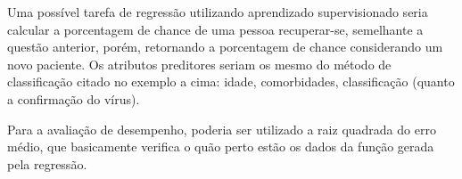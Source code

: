 Uma possível tarefa de regressão utilizando aprendizado supervisionado seria calcular a porcentagem de chance de uma pessoa recuperar-se, semelhante a questão anterior, porém, retornando a porcentagem de chance considerando um novo paciente. Os atributos preditores seriam os mesmo do método de classificação citado no exemplo a cima: idade, comorbidades, classificação (quanto a confirmação do vírus). 

Para a avaliação de desempenho, poderia ser utilizado a raiz quadrada do erro médio, que basicamente verifica o quão perto estão os dados da função gerada pela regressão.
